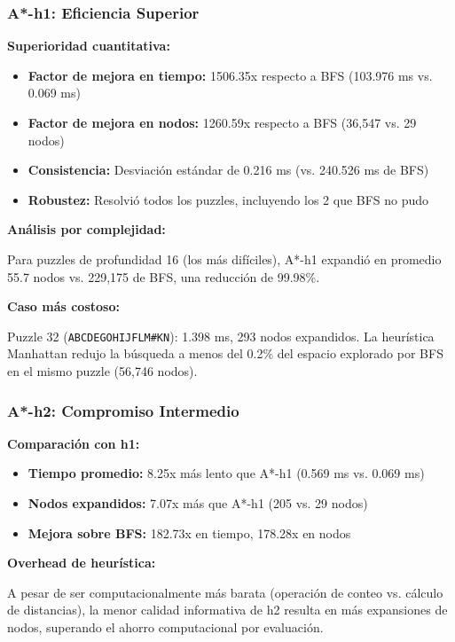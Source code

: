 \documentclass[12pt,a4paper]{article}
\begin{document}
\subsubsection{A*-h1: Eficiencia Superior}

\textbf{Superioridad cuantitativa:}
\begin{itemize}
    \item \textbf{Factor de mejora en tiempo:} 1506.35x respecto a BFS (103.976 ms vs. 0.069 ms)
    \item \textbf{Factor de mejora en nodos:} 1260.59x respecto a BFS (36,547 vs. 29 nodos)
    \item \textbf{Consistencia:} Desviación estándar de 0.216 ms (vs. 240.526 ms de BFS)
    \item \textbf{Robustez:} Resolvió todos los puzzles, incluyendo los 2 que BFS no pudo
\end{itemize}

\textbf{Análisis por complejidad:}

Para puzzles de profundidad 16 (los más difíciles), A*-h1 expandió en promedio 55.7 nodos vs. 229,175 de BFS, una reducción de 99.98\%.

\textbf{Caso más costoso:}

Puzzle 32 (\texttt{ABCDEGOHIJFLM\#KN}): 1.398 ms, 293 nodos expandidos. La heurística Manhattan redujo la búsqueda a menos del 0.2\% del espacio explorado por BFS en el mismo puzzle (56,746 nodos).

\subsubsection{A*-h2: Compromiso Intermedio}

\textbf{Comparación con h1:}
\begin{itemize}
    \item \textbf{Tiempo promedio:} 8.25x más lento que A*-h1 (0.569 ms vs. 0.069 ms)
    \item \textbf{Nodos expandidos:} 7.07x más que A*-h1 (205 vs. 29 nodos)
    \item \textbf{Mejora sobre BFS:} 182.73x en tiempo, 178.28x en nodos
\end{itemize}

\textbf{Overhead de heurística:}

A pesar de ser computacionalmente más barata (operación de conteo vs. cálculo de distancias), la menor calidad informativa de h2 resulta en más expansiones de nodos, superando el ahorro computacional por evaluación.
\end{document}
